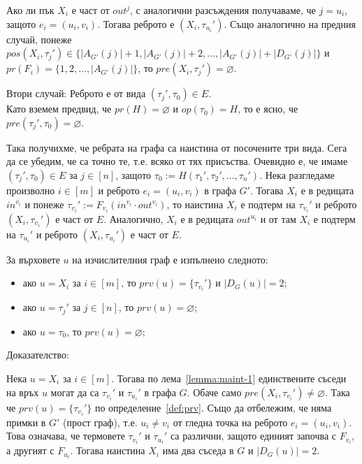 \documentclass[12pt,twoside,a4paper]{article}
\begin{document}
\begin{theorem}
\begin{lemma}
			Ако ли пък $X_i$ е част от $out^j$, с аналогични разсъждения получаваме, че $j=u_i$, защото $e_i=(u_i,v_i)$. Тогава реброто е $(X_i,\tau_{u_i}')$. Също аналогично на предния случай, понеже $pos(X_i,\tau_j') \in \{|A_{G'}(j)|+1, |A_{G'}(j)|+2, \dots, |A_{G'}(j)|+|D_{G'}(j)|\}$ и $pr(F_i)=\{1,2,\dots,|A_{G'}(j)|\}$, то $pre(X_i,\tau_j') = \varnothing$.
			
			Втори случай: Реброто е от вида $(\tau_j',\tau_0) \in E$.\\
			Като вземем предвид, че $pr(H) = \varnothing$ и $op(\tau_0) = H$, то е ясно, че $pre(\tau_j',\tau_0) = \varnothing$.
			
			Така получихме, че ребрата на графа са наистина от посочените три вида. Сега да се убедим, че са точно те, т.е. всяко от тях присъства. Очевидно е, че имаме $(\tau_j',\tau_0) \in E$ за $j \in [n]$, защото $\tau_0 := H(\tau_1', \tau_2', \dots, \tau_n')$. Нека разгледаме произволно $i \in [m]$ и реброто $e_i=(u_i, v_i)$ в графа $G'$. Тогава $X_i$ е в редицата $in^{v_i}$ и понеже $\tau_{v_i}':= F_{v_i}(in^{v_i} \cdot out^{v_i})$, то наистина $X_i$ е подтерм на $\tau_{v_i}'$ и реброто $(X_i,\tau_{v_i}')$ е част от $E$. Аналогично, $X_i$ е в редицата $out^{u_i}$ и от там $X_i$ е подтерм на $\tau_{u_i}'$ и реброто $(X_i,\tau_{u_i}')$ е част от $E$.
		\end{lemma}
		
		\begin{lemma}\label{lemma:maint-2} За върховете $u$ на изчислителния граф е изпълнено следното:
			\begin{itemize}
				\item ако $u = X_i$ за $i \in [m]$, то $prv(u) = \{\tau_{v_i}'\}$ и $|D_G(u)|=2$;
				\item ако $u = \tau_j'$ за $j \in [n]$, то $prv(u) = \varnothing$;
				\item ако $u = \tau_0$, то $prv(u) = \varnothing$;
			\end{itemize}
			
			\noindent Доказателство:
			
			Нека $u = X_i$ за $i \in [m]$. Тогава по лема~\ref{lemma:maint-1} единствените съседи на връх $u$ могат да са $\tau_{v_i}'$ и $\tau_{u_i}'$ в графа $G$. Обаче само $pre(X_i,\tau_{v_i}') \neq \varnothing$. Така че $prv(u) = \{\tau_{v_i}'\}$ по определение~\ref{def:prv}. Също да отбележим, че няма примки в $G'$ (прост граф), т.е. $u_i \neq v_i$ от гледна точка на реброто $e_i=(u_i,v_i)$. Това означава, че термовете $\tau_{v_i}'$ и $\tau_{u_i}'$ са различни, защото единият започва с $F_{v_i}$, а другият с $F_{u_i}$. Тогава наистина $X_i$ има два съседа в $G$ и $|D_G(u)| = 2$.
			

\end{lemma}
\end{theorem}
\end{document}
